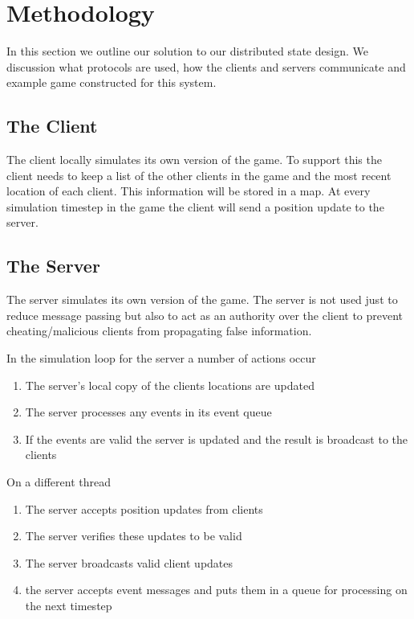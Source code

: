 
\section{Methodology}
\label{sec:methodology}

	In this section we outline our solution to our distributed state design. We discussion what protocols are used, how the clients and servers communicate and example game constructed for this system.
	
\subsection{The Client}

	The client locally simulates its own version of the game. To support this the client needs to keep a list of the other clients in the game and the most recent location of each client. This information will be stored in a map. At every simulation timestep in the game the client will send a position update to the server.
	
\subsection{The Server}

	The server simulates its own version of the game. The server is not used just to reduce message passing but also to act as an authority over the client to prevent cheating/malicious clients from propagating false information.
	
	In the simulation loop for the server a number of actions occur
	\begin{enumerate}
		\item The server's local copy of the clients locations are updated
		\item The server processes any events in its event queue
		\item If the events are valid the server is updated and the result is broadcast to the clients
	\end{enumerate}
	On a different thread
	\begin{enumerate}
		\item The server accepts position updates from clients
		\item The server verifies these updates to be valid
		\item The server broadcasts valid client updates
		\item the server accepts event messages and puts them in a queue for processing on the next timestep
	\end{enumerate}
	
